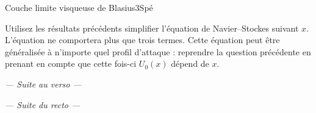 \begin{exercise}{Couche limite visqueuse de Blasius}{3}{Spé}
\begin{questions}
    \question Utilisez les résultats précédents simplifier l'équation de Navier--Stockes suivant $x$. \\
    L'équation ne comportera plus que trois termes.
    \questionbonus Cette équation peut être généralisée à n'importe quel profil d'attaque : reprendre la question précédente en prenant en compte que cette fois-ci $U_0(x)$ dépend de $x$.
\end{questions}

\begin{center}
    \itshape --- \quad Suite au verso \quad ---
\end{center}
\end{exercise}
\pagebreak

\printexerciseheader

\begin{center}
    \itshape --- \quad Suite du recto \quad ---
\end{center}

\bigskip

